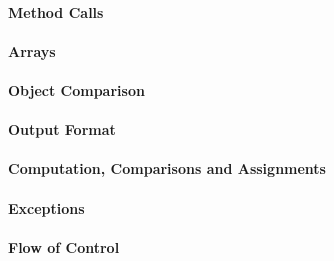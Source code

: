 \paragraph{Method Calls}
\begin{itemize}
\end{itemize}

\paragraph{Arrays}
\begin{itemize}
\end{itemize}

\paragraph{Object Comparison}
\begin{itemize}
\end{itemize}

\paragraph{Output Format}
\begin{itemize}
\end{itemize}

\paragraph{Computation, Comparisons and Assignments}
\begin{itemize}
\end{itemize}

\paragraph{Exceptions}
\begin{itemize}
\end{itemize}

\paragraph{Flow of Control}
\begin{itemize}
\end{itemize}

